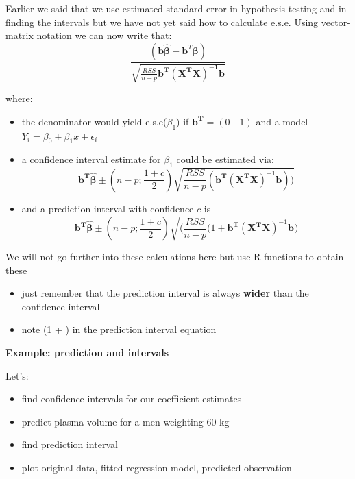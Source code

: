 \documentclass[
]{book}
\providecommand{\tightlist}{%
  \setlength{\itemsep}{0pt}\setlength{\parskip}{0pt}}
\theoremstyle{definition}
\theoremstyle{definition}
\theoremstyle{definition}
\theoremstyle{remark}
\begin{document}
Earlier we said that we use estimated standard error in hypothesis testing and in finding the intervals but we have not yet said how to calculate e.s.e. Using vector-matrix notation we can now write that:
\[\frac{(\mathbf{b}\hat{{\boldsymbol\beta}}-\mathbf{b}^T\boldsymbol\beta)}{\sqrt{\frac{RSS}{n-p}\mathbf{b^T(X^TX)^{-1}b}}}\]

where:

\begin{itemize}
\item
  the denominator would yield e.s.e(\(\beta_1\)) if \(\mathbf{b^T}=(0 \quad 1)\) and a model \(Y_i = \beta_0 + \beta_1x + \epsilon_i\)
\item
  a confidence interval estimate for \(\beta_1\) could be estimated via:
  \[\mathbf{b^T}\hat{\boldsymbol\beta} \pm (n-p; \frac{1+c}{2})\sqrt{\frac{RSS}{n-p}(\mathbf{b^T}(\mathbf{X^T}\mathbf{X})^{-1}\mathbf{b}))}\]
\item
  and a prediction interval with confidence \(c\) is
  \[\mathbf{b^T}\hat{\boldsymbol\beta} \pm (n-p; \frac{1+c}{2})\sqrt{(\frac{RSS}{n-p}(1+\mathbf{b^T}(\mathbf{X^T}\mathbf{X})^{-1}\mathbf{b}})\]
\end{itemize}

We will not go further into these calculations here but use R functions to obtain these

\begin{itemize}
\tightlist
\item
  just remember that the prediction interval is always \textbf{wider} than the confidence interval
\item
  note (1 + ) in the prediction interval equation
\end{itemize}

\textbf{Example: prediction and intervals}

Let's:

\begin{itemize}
\tightlist
\item
  find confidence intervals for our coefficient estimates
\item
  predict plasma volume for a men weighting 60 kg
\item
  find prediction interval
\item
  plot original data, fitted regression model, predicted observation
\end{itemize}
\end{document}
